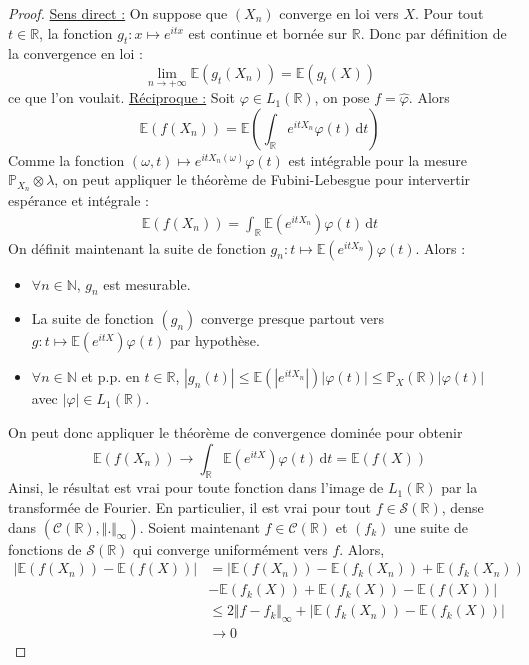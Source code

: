	\begin{proof}
		\uline{Sens direct :} On suppose que $(X_n)$ converge en loi vers $X$. Pour tout $t \in \mathbb{R}$, la fonction $g_t : x \mapsto e^{itx}$ est continue et bornée sur $\mathbb{R}$. Donc par définition de la convergence en loi :
		\[ \lim_{n \rightarrow +\infty} \mathbb{E}(g_t(X_n)) = \mathbb{E}(g_t(X)) \]
		ce que l'on voulait.
		\newpar
		\uline{Réciproque :} Soit $\varphi \in L_1(\mathbb{R})$, on pose $f = \widehat{\varphi}$. Alors
		\[ \mathbb{E}(f(X_n)) = \mathbb{E} \left ( \int_{\mathbb{R}} e^{itX_n} \varphi(t) \, \mathrm{d}t \right ) \]
		Comme la fonction $(\omega, t) \mapsto e^{itX_n(\omega)} \varphi(t)$ est intégrable pour la mesure $\mathbb{P}_{X_n} \otimes \lambda$, on peut appliquer le théorème de Fubini-Lebesgue pour intervertir espérance et intégrale :
		\begin{align*}
			\mathbb{E}(f(X_n)) = \int_{\mathbb{R}} \mathbb{E} (e^{itX_n}) \varphi(t) \, \mathrm{d}t
		\end{align*}
		On définit maintenant la suite de fonction $g_n : t \mapsto \mathbb{E} (e^{itX_n}) \varphi(t)$. Alors :
		\begin{itemize}
			\item $\forall n \in \mathbb{N}$, $g_n$ est mesurable.
			\item La suite de fonction $(g_n)$ converge presque partout vers $g : t \mapsto \mathbb{E} (e^{itX}) \varphi(t)$ par hypothèse.
			\item $\forall n \in \mathbb{N}$ et p.p. en $t \in \mathbb{R}$, $|g_n(t)| \leq \mathbb{E} (|e^{itX_n}|) |\varphi(t)| \leq \mathbb{P}_X(\mathbb{R}) |\varphi(t)|$ avec $|\varphi| \in L_1(\mathbb{R})$.
		\end{itemize}
		On peut donc appliquer le théorème de convergence dominée pour obtenir
		\[ \mathbb{E}(f(X_n)) \longrightarrow \int_{\mathbb{R}} \mathbb{E} (e^{itX}) \varphi(t) \, \mathrm{d}t = \mathbb{E}(f(X)) \]
		Ainsi, le résultat est vrai pour toute fonction dans l'image de $L_1(\mathbb{R})$ par la transformée de Fourier. En particulier, il est vrai pour tout $f \in \mathcal{S}(\mathbb{R})$, dense dans $(\mathcal{C}(\mathbb{R}), \Vert . \Vert_\infty)$. Soient maintenant $f \in \mathcal{C}(\mathbb{R})$ et $(f_k)$ une suite de fonctions de $\mathcal{S}(\mathbb{R})$ qui converge uniformément vers $f$. Alors,
		\begin{align*}
			|\mathbb{E}(f(X_n)) - \mathbb{E}(f(X))| &= |\mathbb{E}(f(X_n)) - \mathbb{E}(f_k(X_n)) + \mathbb{E}(f_k(X_n)) \\
			&- \mathbb{E}(f_k(X)) + \mathbb{E}(f_k(X)) - \mathbb{E}(f(X))| \\
			&\leq 2 \Vert f - f_k \Vert_\infty + |\mathbb{E}(f_k(X_n)) - \mathbb{E}(f_k(X))| \\
			&\longrightarrow 0
		\end{align*}
	\end{proof}

